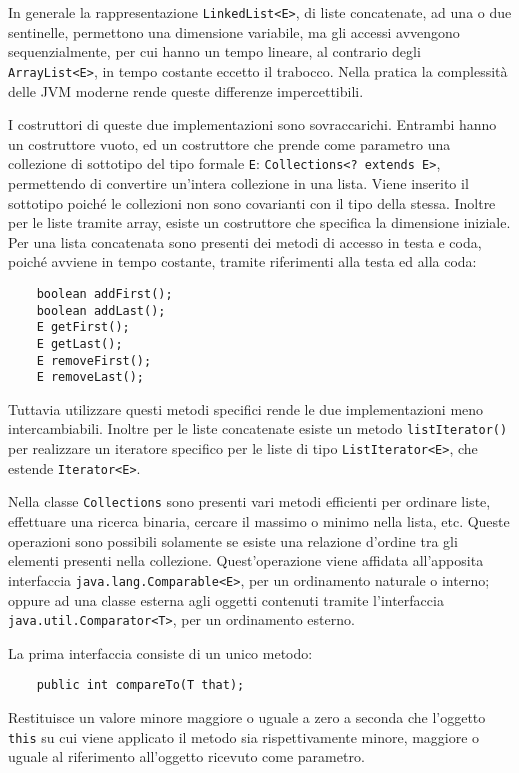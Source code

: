 \documentclass{article}
\numberwithin{equation}{subsection}
\begin{document}
In generale la rappresentazione \verb|LinkedList<E>|, di liste concatenate, ad una o due sentinelle, permettono una dimensione variabile, ma gli accessi 
avvengono sequenzialmente, per cui hanno un tempo lineare, al contrario degli \verb|ArrayList<E>|, in tempo costante eccetto il trabocco. 
Nella pratica la complessità delle JVM moderne rende queste differenze impercettibili. 

I costruttori di queste due implementazioni sono sovraccarichi. Entrambi hanno un costruttore vuoto, ed un costruttore che prende come parametro una collezione di sottotipo 
del tipo formale \verb|E|: \verb|Collections<? extends E>|, permettendo di convertire un'intera collezione in una lista. Viene inserito il sottotipo poiché le collezioni 
non sono covarianti con il tipo della stessa. Inoltre per le liste tramite array, esiste un costruttore che specifica la dimensione iniziale. 
Per una lista concatenata sono presenti dei metodi di accesso in testa e coda, poiché avviene in tempo costante, tramite riferimenti alla testa ed alla coda:
\begin{verbatim}
    boolean addFirst();
    boolean addLast();
    E getFirst();
    E getLast();
    E removeFirst();
    E removeLast();
\end{verbatim}
Tuttavia utilizzare questi metodi specifici rende le due implementazioni meno intercambiabili. 
Inoltre per le liste concatenate esiste un metodo \verb|listIterator()| per realizzare un iteratore specifico per le liste di tipo \verb|ListIterator<E>|, che estende \verb|Iterator<E>|. 


Nella classe \verb|Collections| sono presenti vari metodi efficienti per ordinare liste, effettuare una ricerca binaria, cercare il massimo o minimo nella lista, etc.  
Queste operazioni sono possibili solamente se esiste una relazione d'ordine tra gli elementi presenti nella collezione. 
Quest'operazione viene affidata all'apposita interfaccia \verb|java.lang.Comparable<E>|, per un ordinamento naturale o interno; oppure ad una classe esterna agli oggetti contenuti tramite 
l'interfaccia \verb|java.util.Comparator<T>|, per un ordinamento esterno. 

La prima interfaccia consiste di un unico metodo:
\begin{verbatim}
    public int compareTo(T that); 
\end{verbatim}    
Restituisce un valore minore maggiore o uguale a zero a seconda che l'oggetto \verb|this| su cui viene applicato il metodo sia rispettivamente minore, maggiore o uguale al riferimento 
all'oggetto ricevuto come parametro. 
\end{document}
